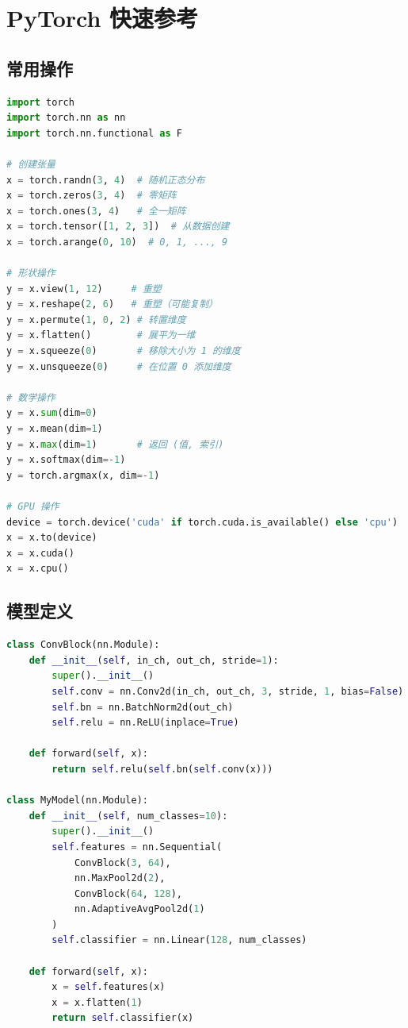 \chapter{PyTorch 快速参考}

\section{常用操作}

\begin{lstlisting}[language=Python, caption={PyTorch 张量常用操作}]
import torch
import torch.nn as nn
import torch.nn.functional as F

# 创建张量
x = torch.randn(3, 4)  # 随机正态分布
x = torch.zeros(3, 4)  # 零矩阵
x = torch.ones(3, 4)   # 全一矩阵
x = torch.tensor([1, 2, 3])  # 从数据创建
x = torch.arange(0, 10)  # 0, 1, ..., 9

# 形状操作
y = x.view(1, 12)     # 重塑
y = x.reshape(2, 6)   # 重塑（可能复制）
y = x.permute(1, 0, 2) # 转置维度
y = x.flatten()        # 展平为一维
y = x.squeeze(0)       # 移除大小为 1 的维度
y = x.unsqueeze(0)     # 在位置 0 添加维度

# 数学操作
y = x.sum(dim=0)
y = x.mean(dim=1)
y = x.max(dim=1)       # 返回 (值, 索引)
y = x.softmax(dim=-1)
y = torch.argmax(x, dim=-1)

# GPU 操作
device = torch.device('cuda' if torch.cuda.is_available() else 'cpu')
x = x.to(device)
x = x.cuda()
x = x.cpu()
\end{lstlisting}

\section{模型定义}

\begin{lstlisting}[language=Python, caption={PyTorch 模型定义模式}]
class ConvBlock(nn.Module):
    def __init__(self, in_ch, out_ch, stride=1):
        super().__init__()
        self.conv = nn.Conv2d(in_ch, out_ch, 3, stride, 1, bias=False)
        self.bn = nn.BatchNorm2d(out_ch)
        self.relu = nn.ReLU(inplace=True)

    def forward(self, x):
        return self.relu(self.bn(self.conv(x)))

class MyModel(nn.Module):
    def __init__(self, num_classes=10):
        super().__init__()
        self.features = nn.Sequential(
            ConvBlock(3, 64),
            nn.MaxPool2d(2),
            ConvBlock(64, 128),
            nn.AdaptiveAvgPool2d(1)
        )
        self.classifier = nn.Linear(128, num_classes)

    def forward(self, x):
        x = self.features(x)
        x = x.flatten(1)
        return self.classifier(x)
\end{lstlisting}

